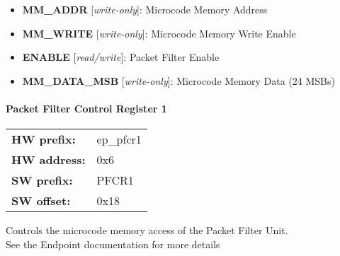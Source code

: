 \begin{itemize}
\item \begin{small}
{\bf 
MM\_ADDR
} [\emph{write-only}]: Microcode Memory Address
\end{small}
\item \begin{small}
{\bf 
MM\_WRITE
} [\emph{write-only}]: Microcode Memory Write Enable
\end{small}
\item \begin{small}
{\bf 
ENABLE
} [\emph{read/write}]: Packet Filter Enable
\end{small}
\item \begin{small}
{\bf 
MM\_DATA\_MSB
} [\emph{write-only}]: Microcode Memory Data (24 MSBs)
\end{small}
\end{itemize}
\paragraph*{Packet Filter Control Register 1}\vspace{12pt}

\begin{tabular}{l l }
{\bf HW prefix:}  & ep\_pfcr1\\
{\bf HW address:}  & 0x6\\
{\bf SW prefix:}  & PFCR1\\
{\bf SW offset:}  & 0x18\\
\end{tabular}

\vspace{12pt}
Controls the microcode memory access of the Packet Filter Unit. \\                      See the Endpoint documentation for more details

